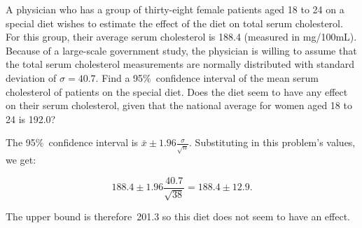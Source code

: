 \begin{problem}
   A physician who has a group of thirty-eight female patients aged 18 to 24 on a special diet wishes to estimate the effect of the diet on total serum cholesterol. For this group, their average serum cholesterol is 188.4 (measured in mg/100mL). Because of a large-scale government study, the physician is willing to assume that the total serum cholesterol measurements are normally distributed with standard deviation of ${\sigma = 40.7}$. Find a 95\%~confidence interval of the mean serum cholesterol of patients on the special diet. Does the diet seem to have any effect on their serum cholesterol, given that the national average for women aged 18 to 24 is 192.0?
\end{problem}

The 95\%~confidence interval is ${\bar{x} \pm 1.96\frac{\sigma}{\sqrt{n}}}$.  Substituting in this problem's values, we get:

\begin{equation*}
  188.4 \pm 1.96 \frac{40.7}{\sqrt{38}} = 188.4 \pm 12.9 \text{.}
\end{equation*}

The upper bound is therefore~201.3 so this diet does not seem to have an effect.
